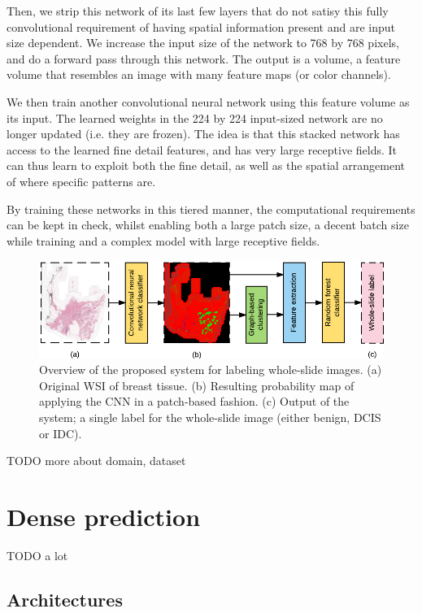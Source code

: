 \documentclass[journal]{IEEEtran}
\begin{document}
Then, we strip this network of its last few layers that do not satisy this fully convolutional requirement of having spatial information present and are input size dependent. We increase the input size of the network to 768 by 768 pixels, and do a forward pass through this network. The output is a volume, a feature volume  that resembles an image with many feature maps (or color channels). 

We then train another convolutional neural network using this feature volume as its input. The learned weights in the 224 by 224 input-sized network are no longer updated (i.e. they are frozen). The idea is that this stacked network has access to the learned fine detail features, and has very large receptive fields. It can thus learn to exploit both the fine detail, as well as the spatial arrangement of where specific patterns are.

By training these networks in this tiered manner, the computational requirements can be kept in check, whilst enabling both a large patch size, a decent batch size while training and a complex model with large receptive fields.

\begin{figure}[!t]
\centering
\hspace{-0.1in}\includegraphics[width=6.5in]{system_overview}%
\caption{Overview of the proposed system for labeling whole-slide images. (a) Original WSI of breast tissue. (b) Resulting probability map of applying the CNN in a patch-based fashion. (c) Output of the system; a single label for the whole-slide image (either benign, DCIS or IDC).}
\end{figure}




TODO more about domain, dataset


\section{Dense prediction}

TODO a lot
\subsection{Architectures}
\end{document}
